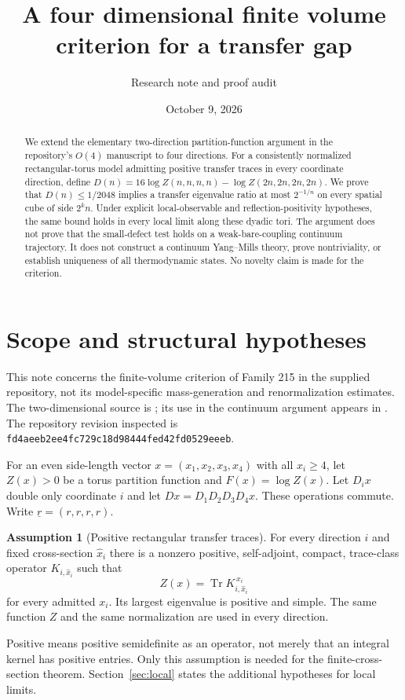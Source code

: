 \documentclass[11pt]{article}
\title{A four dimensional finite volume criterion for a transfer gap}
\author{Research note and proof audit}
\date{October 9, 2026}
\theoremstyle{definition}
\newtheorem{assumption}[theorem]{Assumption}
\theoremstyle{remark}
\newcommand{\Tr}{\operatorname{Tr}}
\begin{document}
\maketitle
\begin{abstract}
We extend the elementary two-direction partition-function argument in the
repository's $O(4)$ manuscript to four directions. For a consistently
normalized rectangular-torus model admitting positive transfer traces in
every coordinate direction, define
$D(n)=16\log Z(n,n,n,n)-\log Z(2n,2n,2n,2n)$.
We prove that $D(n)\le 1/2048$ implies a transfer eigenvalue ratio at most
$2^{-1/n}$ on every spatial cube of side $2^k n$.
Under explicit local-observable and reflection-positivity hypotheses,
the same bound holds in every local limit along these dyadic tori.
The argument does not prove that the small-defect test holds on a weak-bare-coupling
continuum trajectory. It does not construct a continuum Yang--Mills theory,
prove nontriviality, or establish uniqueness of all thermodynamic states.
No novelty claim is made for the criterion.
\end{abstract}
\tableofcontents

\section{Scope and structural hypotheses}
This note concerns the finite-volume criterion of Family 215 in the supplied
repository, not its model-specific mass-generation and renormalization estimates.
The two-dimensional source is \cite[section ``A finite-volume criterion
for the full gap'']{repo-o4}; its use in the continuum argument appears in
\cite[section ``Trace estimates uniform in the cutoff'']{repo-o3}.
The repository revision inspected is
\texttt{fd4aeeb2ee4fc729c18d98444fed42fd0529eeeb}.

For an even side-length vector $x=(x_1,x_2,x_3,x_4)$ with all $x_i\ge4$,
let $Z(x)>0$ be a torus partition function and $F(x)=\log Z(x)$.
Let $D_i x$ double only coordinate $i$ and let $Dx=D_1D_2D_3D_4x$.
These operations commute. Write $\underline r=(r,r,r,r)$.

\begin{assumption}[Positive rectangular transfer traces]\label{ass:trace}
For every direction $i$ and fixed cross-section $\widehat x_i$ there is a
nonzero positive, self-adjoint, compact, trace-class operator
$K_{i,\widehat x_i}$ such that
\[
 Z(x)=\Tr K_{i,\widehat x_i}^{\,x_i}
\]
for every admitted $x_i$. Its largest eigenvalue is positive and simple.
The same function $Z$ and the same normalization are used in every direction.
\end{assumption}
Positive means positive semidefinite as an operator, not merely that an
integral kernel has positive entries. Only this assumption is needed for
the finite-cross-section theorem. Section~\ref{sec:local} states the
additional hypotheses for local limits.
\end{document}
